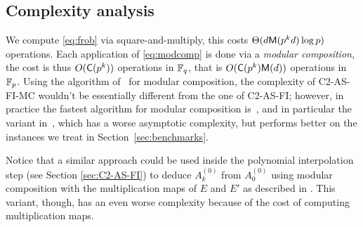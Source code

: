 \subsection{Complexity analysis}
We compute \eqref{eq:frob} via square-and-multiply, this costs
$\Theta(d\mathrm{\sf M}(p^kd)\log p)$ operations. Each application of
\eqref{eq:modcomp} is done via a \emph{modular composition}, the cost
is thus $O(\mathrm{\sf C}(p^k))$ operations in $\mathbb{F}_q$, that is
$O(\mathrm{\sf C}(p^k)\mathrm{\sf M}(d))$ operations in $\mathbb{F}_p$. Using the algorithm
of~\cite{KeUm08} for modular composition, the complexity of
C2-AS-FI-MC wouldn't be essentially different from the one of
C2-AS-FI; however, in practice the fastest algorithm for modular
composition is~\cite{BrKu78}, and in particular the variant
in~\cite[Lemma 3]{KS98}, which has a worse asymptotic complexity, but
performs better on the instances we treat in
Section~\ref{sec:benchmarks}.

Notice that a similar approach could be used inside the polynomial
interpolation step (see Section \ref{sec:C2-AS-FI}) to deduce
$A_k^{(0)}$ from $A_0^{(0)}$ using modular composition with the
multiplication maps of $E$ and $E'$ as described in
\cite[$\S$2.3]{Cou96}. This variant, though, has an even worse
complexity because of the cost of computing multiplication maps.




%
